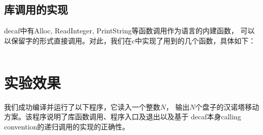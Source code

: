 \documentclass[a4paper]{article}
\begin{document}
\subsection{库调用的实现}
decaf中有Alloc, ReadInteger, PrintString等函数调用作为语言的内建函数，
可以以保留字的形式直接调用。对此，我们在c中实现了用到的几个函数，具体如下：
\inputminted[linenos,fontsize=\small,tabsize=4]{c}{../userlib.c}


\section{实验效果}
我们成功编译并运行了以下程序，它读入一个整数$N$，
输出$N$个盘子的汉诺塔移动方案。该程序说明了库函数调用、程序入口及退出以及基于
decaf本身calling convention的递归调用的实现的正确性。
\inputminted[linenos,fontsize=\small,tabsize=4]{java}{../hanoi.decaf}
\end{document}
